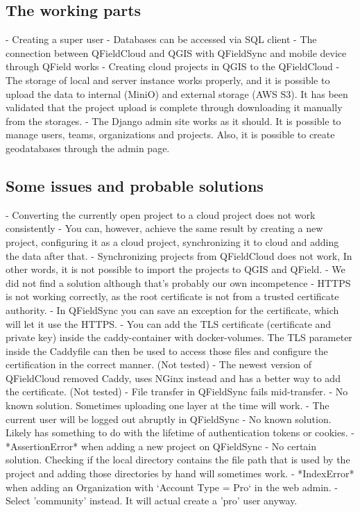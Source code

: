 \documentclass{article}
\begin{document}
\subsection{The working parts}
\begin{markdown}
- Creating a super user
- Databases can be accessed via SQL client
- The connection between QFieldCloud and QGIS with QFieldSync and mobile device through QField works
- Creating cloud projects in QGIS to the QFieldCloud
- The storage of local and server instance works properly, and it is possible to upload the data to internal (MiniO) and external storage (AWS S3). It has been validated that the project upload is complete through downloading it manually from the storages.
- The Django admin site works as it should. It is possible to manage users, teams, organizations and projects. Also, it is possible to create geodatabases through the admin page.
\end{markdown}

\subsection{Some issues and probable solutions}
\begin{markdown}
- Converting the currently open project to a cloud project does not work consistently
    - You can, however, achieve the same result by creating a new project, configuring it as a cloud project, synchronizing it to cloud and adding the data after that.
- Synchronizing projects from QFieldCloud does not work, In other words, it is not possible to import the projects to QGIS and QField.
    - We did not find a solution although that's probably our own incompetence 
- HTTPS is not working correctly, as the root certificate is not from a trusted certificate authority.
    - In QFieldSync you can save an exception for the certificate, which will let it use the HTTPS.
    - You can add the TLS certificate (certificate and private key) inside the caddy-container with docker-volumes. The TLS parameter inside the Caddyfile can then be used to access those files and configure the certification in the correct manner. (Not tested)
    - The newest version of QFieldCloud removed Caddy, uses NGinx instead and has a better way to add the certificate. (Not tested)
- File transfer in QFieldSync fails mid-transfer.
    - No known solution. Sometimes uploading one layer at the time will work. 
- The current user will be logged out abruptly in QFieldSync
    - No known solution. Likely has something to do with the lifetime of authentication tokens or cookies.
- *AssertionError* when adding a new project on QFieldSync
    - No certain solution. Checking if the local directory contains the file path that is used by the project and adding those directories by hand will sometimes work. 
- *IndexError* when adding an Organization with `Account Type = Pro` in the web admin. 
    - Select 'community' instead. It will actual create a 'pro' user anyway.
\end{markdown}
\end{document}
